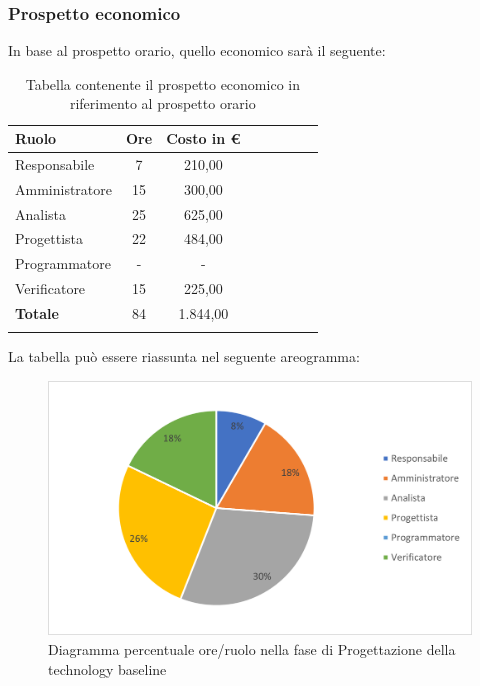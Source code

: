 			\subsubsection{Prospetto economico}
			In base al prospetto orario, quello economico sarà il seguente: 
			
			\begin{longtable}{|l|c|c|c|c|c|c|c|}
				\hline
				\rowcolor{lighter-grayer}
				\textbf{Ruolo} & \textbf{Ore} & \textbf{Costo in €} \\
				\hline
				\endfirsthead
				
				\hline
				Responsabile & 7 & 210,00\\
				\hline
				\hline
				Amministratore & 15 & 300,00\\
				\hline
				\hline
				Analista & 25 & 625,00\\
				\hline
				\hline
				Progettista & 22 & 484,00\\
				\hline
				\hline
				Programmatore & - & -\\
				\hline
				\hline
				Verificatore & 15 & 225,00\\
				\hline
				\hline
				\textbf{Totale} & 84 & 1.844,00\\
				\hline
				\rowcolor{white}
				\caption{Tabella contenente il prospetto economico in riferimento al prospetto orario}
			\end{longtable}
			\pagebreak
		
			La tabella può essere riassunta nel seguente areogramma:
			\begin{figure}[H]
				\centering
				\includegraphics[width=0.8\linewidth]{res/images/preventivo/3-2.png}
				\caption{Diagramma percentuale ore/ruolo nella fase di Progettazione della technology baseline }
				\label{fig:diagramma costi ruolo fase progettazione della technology baseline }
            \end{figure}

